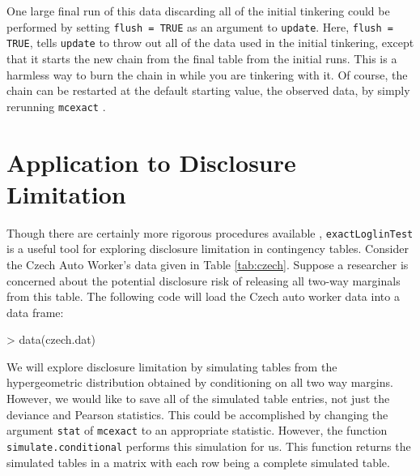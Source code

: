 \documentclass[a4paper]{article}
\newcommand{\mcexact}{\texttt{mcexact} }
\begin{document}
One large final run of this data discarding all of the initial
tinkering could be performed by setting \texttt{flush = TRUE} as an
argument to \texttt{update}.  Here, \texttt{flush = TRUE}, tells
\texttt{update} to throw out all of the data used in the initial
tinkering, except that it starts the new chain from the final table
from the initial runs. This is a harmless way to burn the chain in
while you are tinkering with it.  Of course, the chain can be
restarted at the default starting value, the observed data, by simply
rerunning \mcexact.

\section{Application to Disclosure Limitation}
Though there are certainly more rigorous procedures available
\citep[see][]{dobra}, \texttt{exactLoglinTest} is a useful tool for exploring
disclosure limitation in contingency tables.  Consider the Czech Auto
Worker's data given in Table \ref{tab:czech}. Suppose a researcher is
concerned about the potential disclosure risk of releasing all two-way
marginals from this table. The following code will load the Czech auto
worker data into a data frame:
\begin{Schunk}
\begin{Sinput}
> data(czech.dat)
\end{Sinput}
\end{Schunk}

We will explore disclosure limitation by simulating tables from the
hypergeometric distribution obtained by conditioning on all two way
margins. However, we would like to save all of the simulated table
entries, not just the deviance and Pearson statistics. This could be
accomplished by changing the argument \texttt{stat} of \mcexact to an
appropriate statistic. However, the function
\texttt{simulate.conditional} performs this simulation for us. This
function returns the simulated tables in a matrix with each row being
a complete simulated table.
\end{document}
